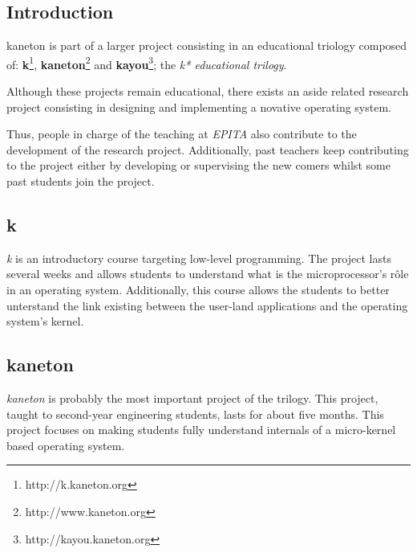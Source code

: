 \begin{multicols}{2}

\tableofcontents

%
%

\section{Introduction}

kaneton is part of a larger project consisting in an educational
triology composed of:
  \textbf{k}\footnote{http://k.kaneton.org},
  \textbf{kaneton}\footnote{http://www.kaneton.org} and
  \textbf{kayou}\footnote{http://kayou.kaneton.org}; the
\textit{k* educational trilogy}.

Although these projects remain educational, there exists an aside related
research project consisting in designing and implementing a novative operating
system.

Thus, people in charge of the teaching at \textit{EPITA} also contribute to
the development of the research project. Additionally, past teachers keep
contributing to the project either by developing or supervising the
new comers whilst some past students join the project.

%
%

\subsection{k}

\textit{k} is an introductory course targeting low-level programming. The
project lasts several weeks and allows students to understand what is the
microprocessor's r\^ole in an operating system. Additionally, this course
allows the students to better unterstand the link existing between the
user-land applications and the operating system's kernel.

%
%

\subsection{kaneton}

\textit{kaneton} is probably the most important project of the trilogy. This
project, taught to second-year engineering students, lasts for about five
months. This project focuses on making students fully understand
internals of a micro-kernel based operating system.

%
%


\end{multicols}
